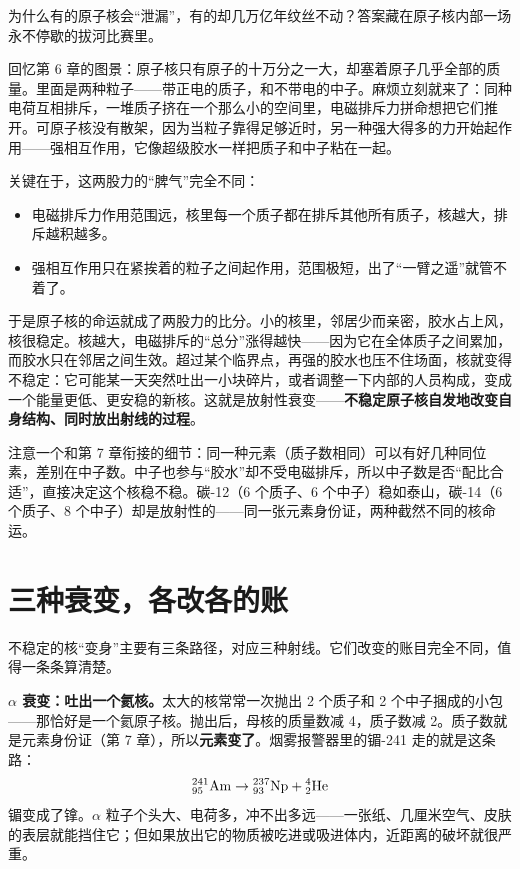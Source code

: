 为什么有的原子核会“泄漏”，有的却几万亿年纹丝不动？答案藏在原子核内部一场永不停歇的拔河比赛里。

回忆第 6 章的图景：原子核只有原子的十万分之一大，却塞着原子几乎全部的质量。里面是两种粒子——带正电的质子，和不带电的中子。麻烦立刻就来了：同种电荷互相排斥，一堆质子挤在一个那么小的空间里，电磁排斥力拼命想把它们推开。可原子核没有散架，因为当粒子靠得足够近时，另一种强大得多的力开始起作用——强相互作用，它像超级胶水一样把质子和中子粘在一起。

关键在于，这两股力的“脾气”完全不同：

\begin{itemize}[itemsep=2pt]
\item 电磁排斥力作用范围远，核里每一个质子都在排斥其他所有质子，核越大，排斥越积越多。
\item 强相互作用只在紧挨着的粒子之间起作用，范围极短，出了“一臂之遥”就管不着了。
\end{itemize}

于是原子核的命运就成了两股力的比分。小的核里，邻居少而亲密，胶水占上风，核很稳定。核越大，电磁排斥的“总分”涨得越快——因为它在全体质子之间累加，而胶水只在邻居之间生效。超过某个临界点，再强的胶水也压不住场面，核就变得不稳定：它可能某一天突然吐出一小块碎片，或者调整一下内部的人员构成，变成一个能量更低、更安稳的新核。这就是放射性衰变——\textbf{不稳定原子核自发地改变自身结构、同时放出射线的过程}。

注意一个和第 7 章衔接的细节：同一种元素（质子数相同）可以有好几种同位素，差别在中子数。中子也参与“胶水”却不受电磁排斥，所以中子数是否“配比合适”，直接决定这个核稳不稳。碳-12（6 个质子、6 个中子）稳如泰山，碳-14（6 个质子、8 个中子）却是放射性的——同一张元素身份证，两种截然不同的核命运。

\section{三种衰变，各改各的账}

不稳定的核“变身”主要有三条路径，对应三种射线。它们改变的账目完全不同，值得一条条算清楚。

\textbf{$\alpha$ 衰变：吐出一个氦核。}太大的核常常一次抛出 2 个质子和 2 个中子捆成的小包——那恰好是一个氦原子核。抛出后，母核的质量数减 4，质子数减 2。质子数就是元素身份证（第 7 章），所以\textbf{元素变了}。烟雾报警器里的镅-241 走的就是这条路：
\[{}^{241}_{95}\mathrm{Am} \rightarrow {}^{237}_{93}\mathrm{Np} + {}^{4}_{2}\mathrm{He}\]
镅变成了镎。$\alpha$ 粒子个头大、电荷多，冲不出多远——一张纸、几厘米空气、皮肤的表层就能挡住它；但如果放出它的物质被吃进或吸进体内，近距离的破坏就很严重。

